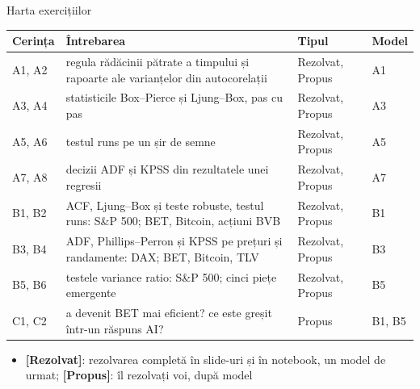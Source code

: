 \begin{frame}{Harta exercițiilor}
\itemsize{\small}
\begin{center}
\footnotesize
\begin{tabular}{>{\raggedright\arraybackslash}p{1.1cm}>{\raggedright\arraybackslash}p{7.5cm}>{\raggedright\arraybackslash}p{1.9cm}>{\raggedright\arraybackslash}p{1.4cm}}
\toprule
\textbf{Cerința} & \textbf{Întrebarea} & \textbf{Tipul} & \textbf{Model} \\
\midrule
A1, A2 & regula rădăcinii pătrate a timpului și rapoarte ale varianțelor din autocorelații & Rezolvat, Propus & A1 \\
A3, A4 & statisticile Box--Pierce și Ljung--Box, pas cu pas & Rezolvat, Propus & A3 \\
A5, A6 & testul runs pe un șir de semne & Rezolvat, Propus & A5 \\
A7, A8 & decizii ADF și KPSS din rezultatele unei regresii & Rezolvat, Propus & A7 \\
B1, B2 & ACF, Ljung--Box și teste robuste, testul runs: S\&P 500; BET, Bitcoin, acțiuni BVB & Rezolvat, Propus & B1 \\
B3, B4 & ADF, Phillips--Perron și KPSS pe prețuri și randamente: DAX; BET, Bitcoin, TLV & Rezolvat, Propus & B3 \\
B5, B6 & testele variance ratio: S\&P 500; cinci piețe emergente & Rezolvat, Propus & B5 \\
C1, C2 & a devenit BET mai eficient? ce este greșit într-un răspuns AI? & Propus & B1, B5 \\
\bottomrule
\end{tabular}
\end{center}
\begin{itemize}
    \item \textbf{[Rezolvat]}: rezolvarea completă în slide-uri și în notebook, un model de urmat; \textbf{[Propus]}: îl rezolvați voi, după model
\end{itemize}
\end{frame}

